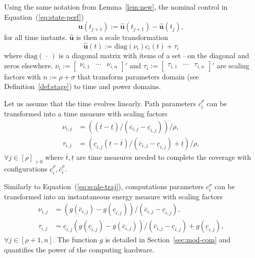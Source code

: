 \documentclass[letterpaper,10pt,journal,twoside]{IEEEtran}
\theoremstyle{definition}
\begin{document}
Using the same notation from Lemma~\ref{lem:new}, the nominal control in Equation~(\ref{eq:state-perf})
\begin{equation}
  \mathbf{u}(t_{j+1}):=\hat{\mathbf{u}}(t_{j+1})-\hat{\mathbf{u}}(t_j),
\end{equation}
for all time instants. $\hat{\mathbf{u}}$ is then a scale transformation
\begin{equation}
  \hat{\mathbf{u}}(t):=\mathrm{diag}(\nu_i)c_i(t)+\tau_i
\end{equation}
where $\mathrm{diag}(\,\cdot\,)$ is a diagonal matrix with items of a set $\cdot$ on the diagonal and zeros elsewhere. $\nu_i:=\begin{bmatrix}\nu_{i,1}&\cdots&\nu_{i,n}\end{bmatrix}'$ and $\tau_i:=\begin{bmatrix}\tau_{i,1}&\cdots&\tau_{i,n}\end{bmatrix}'$ are scaling factors with $n:=\rho+\sigma$ that transform parameters domain (see Definition~\ref{def:stage}) to time and power domains.

Let us assume that the time evolves linearly. Path parameters $c_i^\rho$ can be transformed into a time measure with scaling factors\begin{subequations}\label{eq:scale-traj}\begin{align}
  \nu_{i,j}&=\left((\overline{t}-\underline{t})/(\overline{c}_{i,j}-\underline{c}_{i,j})\right)/\rho,\\
  \tau_{i,j}&=\left(\underline{c}_{i,j}(\underline{t}-\overline{t})/(\overline{c}_{i,j}-\underline{c}_{i,j})+\underline{t}\right)/\rho,
\end{align}\end{subequations} 
$\forall j\in[\rho]_{>0}$ where $\overline{t},\underline{t}$ are time measures needed to complete the coverage with configurations $\underline{c}_i^\rho,\overline{c}_i^\rho$.

Similarly to Equation~(\ref{eq:scale-traj}), computations parameters $c_i^\sigma$ can be transformed into an instantaneous energy measure with scaling factors
\begin{subequations}\label{eq:scale-comp}\begin{align}
  \nu_{i,j}&=(g(\overline{c}_{i,j})-g(\underline{c}_{i,j}))/(\overline{c}_{i,j}-\underline{c}_{i,j}),\\
  \tau_{i,j}&=\underline{c}_{i,j}(g(\underline{c}_{i,j})-g(\overline{c}_{i,j}))/(\overline{c}_{i,j}-\underline{c}_{i,j})+g(\underline{c}_{i,j}),
\end{align}\end{subequations}
$\forall j\in[\rho+1,n]$. The function $g$ is detailed in Section~\ref{sec:mod-com} and quantifies the power of the computing hardware.
\end{document}
